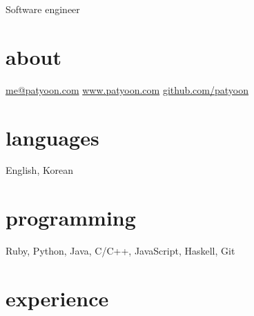 \documentclass[]{patyoon-cv}
\begin{document}
{Software engineer}

\begin{aside}
  \section{about}
  \href{mailto:me@patyoon.com}{me@patyoon.com}
  \href{https://patyoon.com}{www.patyoon.com}
  \href{http://github.com/patyoon}{github.com/patyoon}
  \section{languages}
  English, Korean
  \section{programming}
  Ruby, Python,
  Java, C/C++,
  JavaScript,
  Haskell, Git
\end{aside}

\section{experience}
\end{document}
